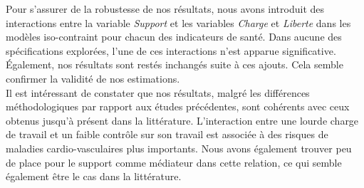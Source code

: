 \documentclass[a4paper, oneside, titlepage]{article}
\begin{document}
Pour s'assurer de la robustesse de nos résultats, nous avons introduit des interactions entre la variable \textit{Support} et les variables \textit{Charge} et \textit{Liberte} dans les modèles iso-contraint pour chacun des indicateurs de santé. Dans aucune des spécifications explorées, l'une de ces interactions n'est apparue significative. Également, nos résultats sont restés inchangés suite à ces ajouts. Cela semble confirmer la validité de nos estimations.
\\
Il est intéressant de constater que nos résultats, malgré les différences méthodologiques par rapport aux études précédentes, sont cohérents avec ceux obtenus jusqu'à présent dans la littérature. L'interaction entre une lourde charge de travail et un faible contrôle sur son travail est associée à des risques de maladies cardio-vasculaires plus importants. Nous avons également trouver peu de place pour le support comme médiateur dans cette relation, ce qui semble également être le cas dans la littérature.
\end{document}
